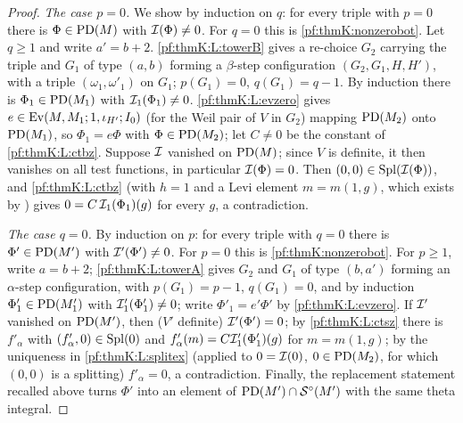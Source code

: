 \begin{proof}
\emph{The case $p=0$.} We show by induction on $q$: for every triple with $p=0$ there is $\Phi\in\operatorname{PD}(M)$ with
$\mathcal{I}(\Phi)\ne0$. For $q=0$ this is \cref{pf:thmK:nonzerobot}. Let $q\ge1$ and write $a'=b+2$. \ref{pf:thmK:L:towerB} gives a
re-choice $G_2$ carrying the triple and $G_1$ of type $(a,b)$ forming a $\beta$-step configuration $(G_2,G_1,H,H')$, with a
triple $(\omega_1,\omega'_1)$ on $G_1$; $p(G_1)=0$, $q(G_1)=q-1$. By induction there is $\Phi_1\in\operatorname{PD}(M_1)$ with
$\mathcal{I}_1(\Phi_1)\ne0$. \ref{pf:thmK:L:evzero} gives $e\in\operatorname{Ev}(M,M_1;1,\iota_{H'};I_0)$ (for the Weil pair of $V$ in $G_2$)
mapping $\operatorname{PD}(M_2)$ onto $\operatorname{PD}(M_1)$, so $\Phi_1=e\Phi$ with $\Phi\in\operatorname{PD}(M_2)$; let $C\ne0$ be the constant of
\ref{pf:thmK:L:ctbz}. Suppose $\mathcal{I}$ vanished on $\operatorname{PD}(M)$; since $V$ is definite, it then vanishes on all test functions,
in particular $\mathcal{I}(\Phi)=0$. Then $(0,0)\in\operatorname{Spl}(\mathcal{I}(\Phi))$, and \ref{pf:thmK:L:ctbz} (with $h=1$ and a Levi element
$m=m(1,g)$, which exists by ) gives $0=C\,\mathcal{I}_1(\Phi_1)(g)$ for every $g$, a
contradiction.

\emph{The case $q=0$.} By induction on $p$: for every triple with $q=0$ there is $\Phi'\in\operatorname{PD}(M')$ with
$\mathcal{I}'(\Phi')\ne0$. For $p=0$ this is \cref{pf:thmK:nonzerobot}. For $p\ge1$, write $a=b+2$; \ref{pf:thmK:L:towerA} gives
$G_2$ and $G_1$ of type $(b,a')$ forming an $\alpha$-step configuration, with $p(G_1)=p-1$, $q(G_1)=0$, and by induction
$\Phi'_1\in\operatorname{PD}(M'_1)$ with $\mathcal{I}'_1(\Phi'_1)\ne0$; write $\Phi'_1=e'\Phi'$ by \ref{pf:thmK:L:evzero}. If $\mathcal{I}'$ vanished
on $\operatorname{PD}(M')$, then ($V'$ definite) $\mathcal{I}'(\Phi')=0$; by \ref{pf:thmK:L:ctsz} there is $f'_\alpha$ with
$(f'_\alpha,0)\in\operatorname{Spl}(0)$ and $f'_\alpha(m)=C\mathcal{I}'_1(\Phi'_1)(g)$ for $m=m(1,g)$; by the uniqueness in
\ref{pf:thmK:L:splitex} (applied to $0=\mathcal{I}(0)$, $0\in\operatorname{PD}(M_2)$, for which $(0,0)$ is a splitting) $f'_\alpha=0$, a
contradiction. Finally, the replacement statement recalled above turns $\Phi'$ into an element of $\operatorname{PD}(M')\cap\mathcal{S}^{\circ}(M')$
with the same theta integral.
\end{proof}

